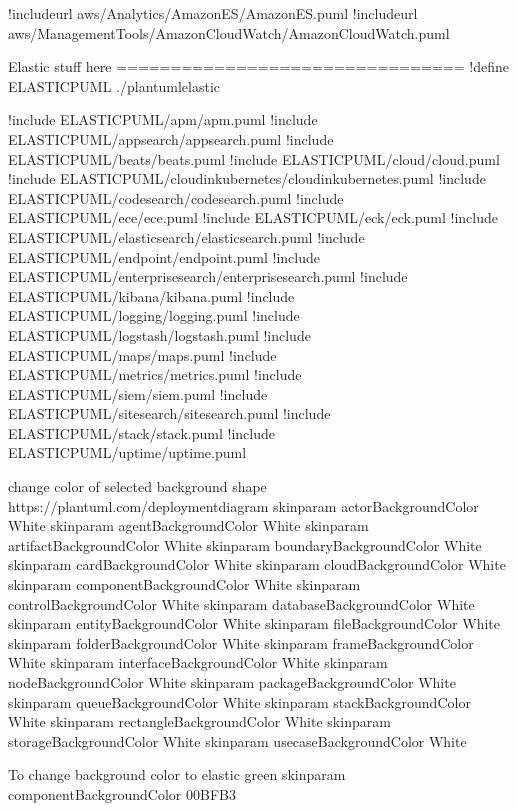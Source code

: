 \documentclass[letterpaper,10pt,english]{sphinxmanual}
\begin{document}
\begin{sphinxVerbatim}[commandchars=\\\{\},numbers=left,firstnumber=1,stepnumber=1]
!includeurl \PYGZlt{}aws/Analytics/AmazonES/AmazonES.puml\PYGZgt{}
!includeurl \PYGZlt{}aws/ManagementTools/AmazonCloudWatch/AmazonCloudWatch.puml\PYGZgt{}

\PYGZsq{}Elastic stuff here
\PYGZsq{}================================
!define ELASTIC\PYGZus{}PUML ./plantuml\PYGZhy{}elastic

!include ELASTIC\PYGZus{}PUML/apm/apm.puml
!include ELASTIC\PYGZus{}PUML/app\PYGZus{}search/app\PYGZus{}search.puml
!include ELASTIC\PYGZus{}PUML/beats/beats.puml
!include ELASTIC\PYGZus{}PUML/cloud/cloud.puml
!include ELASTIC\PYGZus{}PUML/cloud\PYGZus{}in\PYGZus{}kubernetes/cloud\PYGZus{}in\PYGZus{}kubernetes.puml
!include ELASTIC\PYGZus{}PUML/code\PYGZus{}search/code\PYGZus{}search.puml
!include ELASTIC\PYGZus{}PUML/ece/ece.puml
!include ELASTIC\PYGZus{}PUML/eck/eck.puml
!include ELASTIC\PYGZus{}PUML/elastic\PYGZus{}search/elastic\PYGZus{}search.puml
!include ELASTIC\PYGZus{}PUML/endpoint/endpoint.puml
!include ELASTIC\PYGZus{}PUML/enterprise\PYGZus{}search/enterprise\PYGZus{}search.puml
!include ELASTIC\PYGZus{}PUML/kibana/kibana.puml
!include ELASTIC\PYGZus{}PUML/logging/logging.puml
!include ELASTIC\PYGZus{}PUML/logstash/logstash.puml
!include ELASTIC\PYGZus{}PUML/maps/maps.puml
!include ELASTIC\PYGZus{}PUML/metrics/metrics.puml
!include ELASTIC\PYGZus{}PUML/siem/siem.puml
!include ELASTIC\PYGZus{}PUML/site\PYGZus{}search/site\PYGZus{}search.puml
!include ELASTIC\PYGZus{}PUML/stack/stack.puml
!include ELASTIC\PYGZus{}PUML/uptime/uptime.puml


\PYGZsq{}change color of selected background shape https://plantuml.com/deployment\PYGZhy{}diagram
skinparam actorBackgroundColor White 
skinparam agentBackgroundColor White 
skinparam artifactBackgroundColor White 
skinparam boundaryBackgroundColor White 
skinparam cardBackgroundColor White 
skinparam cloudBackgroundColor White 
skinparam componentBackgroundColor White 
skinparam controlBackgroundColor White 
skinparam databaseBackgroundColor White 
skinparam entityBackgroundColor White 
skinparam fileBackgroundColor White 
skinparam folderBackgroundColor White 
skinparam frameBackgroundColor White 
skinparam interfaceBackgroundColor White 
skinparam nodeBackgroundColor White 
skinparam packageBackgroundColor White 
skinparam queueBackgroundColor White 
skinparam stackBackgroundColor White 
skinparam rectangleBackgroundColor White 
skinparam storageBackgroundColor White 
skinparam usecaseBackgroundColor White 



\PYGZsq{}To change background color to elastic green
\PYGZsq{}skinparam componentBackgroundColor 00BFB3 


\end{sphinxVerbatim}
\end{document}
